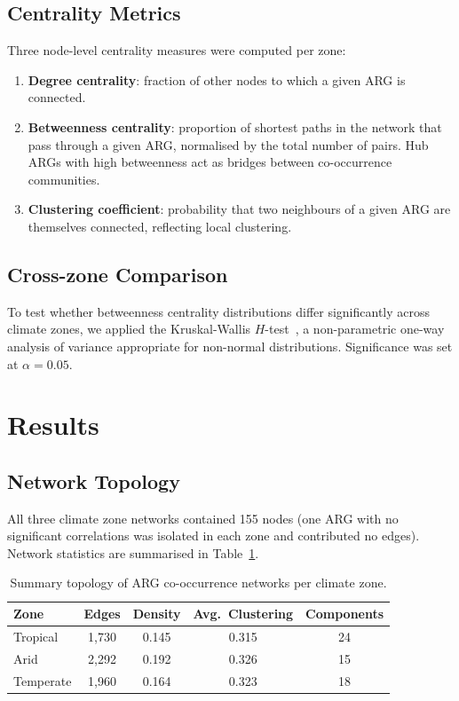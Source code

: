 \documentclass[12pt,a4paper]{article}
\begin{document}
\subsection{Centrality Metrics}\label{sec:centrality}

Three node-level centrality measures were computed per zone:
\begin{enumerate}
  \item \textbf{Degree centrality}: fraction of other nodes to which
    a given ARG is connected.
  \item \textbf{Betweenness centrality}: proportion of shortest paths
    in the network that pass through a given ARG, normalised by the
    total number of pairs.
    Hub ARGs with high betweenness act as bridges between co-occurrence
    communities.
  \item \textbf{Clustering coefficient}: probability that two
    neighbours of a given ARG are themselves connected,
    reflecting local clustering.
\end{enumerate}

\subsection{Cross-zone Comparison}\label{sec:stats}

To test whether betweenness centrality distributions differ
significantly across climate zones, we applied the
Kruskal-Wallis $H$-test~\cite{Kruskal1952}, a non-parametric
one-way analysis of variance appropriate for non-normal distributions.
Significance was set at $\alpha = 0.05$.


\section{Results}\label{results}

\subsection{Network Topology}\label{sec:res-topology}

All three climate zone networks contained 155 nodes (one ARG with
no significant correlations was isolated in each zone and contributed
no edges).
Network statistics are summarised in Table~\ref{tab:netstat}.

\begin{table}[htbp]
  \centering
  \caption{Summary topology of ARG co-occurrence networks per climate zone.}
  \label{tab:netstat}
  \begin{tabular}{lcccc}
    \toprule
    Zone      & Edges & Density & Avg.\ Clustering & Components \\
    \midrule
    Tropical  & 1,730 & 0.145   & 0.315            & 24 \\
    Arid      & 2,292 & 0.192   & 0.326            & 15 \\
    Temperate & 1,960 & 0.164   & 0.323            & 18 \\
    \bottomrule
  \end{tabular}
\end{table}
\end{document}
